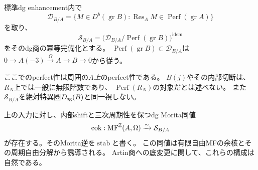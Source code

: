 \begin{definition}[周囲でperfectな特異圏]\label{am:def:relative-singularity}
標準dg enhancement内で
\[
 \mathcal D_{B/A}
 =\{M\in D^b(\operatorname{gr}B):
       \operatorname{Res}_A M\in\operatorname{Perf}(\operatorname{gr}A)\}
\]
を取り、
\[
 \mathcal S_{B/A}
 =\bigl(\mathcal D_{B/A}/\operatorname{Perf}(\operatorname{gr}B)\bigr)^{\mathrm{idem}}
\]
をそのdg商の冪等完備化とする。
$\operatorname{Perf}(\operatorname{gr}B)\subset\mathcal D_{B/A}$は
$0\to A(-3)\xrightarrow{\Omega}A\to B\to0$から従う。
\end{definition}

ここでのperfect性は周囲の\emph{$A$上}のperfect性である。
$B(j)$やその内部切断は、$R_N$上では一般に無限階数であり、
$\operatorname{Perf}(R_N)$の対象だとは述べない。
また$\mathcal S_{B/A}$を絶対特異圏$D_{\rm sg}(B)$と同一視しない。

\begin{lemma}\label{am:lem:stabilization}
上の入力に対し、内部shiftと三次周期性を保つdg Morita同値
\begin{equation}\label{am:eq:stabilization}
 \operatorname{cok}:
 \operatorname{MF}^{\mathbb Z}(A,\Omega)\xrightarrow{\sim}\mathcal S_{B/A}
\end{equation}
が存在する。そのMorita逆を$\operatorname{stab}$と書く。
この同値は有限自由MFの余核とその周期自由分解から誘導される。
Artin商への底変更に関して、これらの構成は自然である。
\end{lemma}

